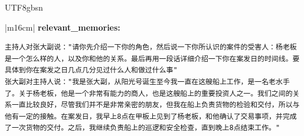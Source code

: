 \documentclass[11pt]{article}
\begin{document}
{\begin{CJK}{UTF8}{gbsn}
\begin{table}[ht!]
\begin{tabular}{|m{16cm}|}
\textbf{   relevant\_memories:} \\
\begin{minipage}[t]{\linewidth}
\small\begin{verbatim}
主持人对张大副说："请你先介绍一下你的角色，然后说一下你所认识的案件的受害人：杨老板是一个怎么样的人，以及你和他的关系。最后再用一段话详细介绍一下你在案发日的时间线。要具体到你在案发之日几点几分见过什么人和做过什么事"
张大副对主持人说："我是张大副，从阳光号诞生至今我一直在这艘船上工作，是一名老水手了。关于杨老板，他是一个非常有能力的商人，也是这艘船上的重要投资人之一。我们之间的关系一直比较良好，尽管我们并不是非常亲密的朋友，但我在船上负责货物的检验和交付，所以与他有一定的接触。在案发日，我早上8点在甲板上见到了杨老板，和他确认了交易事项，并完成了一次货物的交付。之后，我继续负责船上的巡逻和安全检查，直到晚上8点结束工作。"

\end{verbatim}
\end{minipage} \\


\end{tabular}
\end{table}
\end{CJK}}
\end{document}
